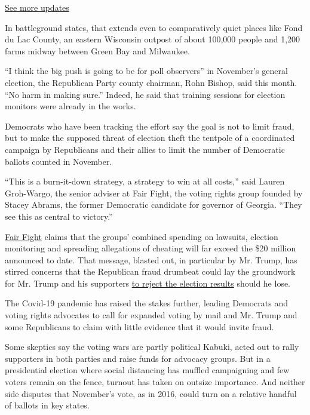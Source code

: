 \href{https://www.nytimes.com/2020/08/04/us/elections/primary-election-michigan-arizona-kansas.html?action=click\&pgtype=Article\&state=default\&region=MAIN_CONTENT_1\&context=storylines_live_updates}{See
more updates}

In battleground states, that extends even to comparatively quiet places
like Fond du Lac County, an eastern Wisconsin outpost of about 100,000
people and 1,200 farms midway between Green Bay and Milwaukee.

``I think the big push is going to be for poll observers'' in November's
general election, the Republican Party county chairman, Rohn Bishop,
said this month. ``No harm in making sure.'' Indeed, he said that
training sessions for election monitors were already in the works.

Democrats who have been tracking the effort say the goal is not to limit
fraud, but to make the supposed threat of election theft the tentpole of
a coordinated campaign by Republicans and their allies to limit the
number of Democratic ballots counted in November.

``This is a burn-it-down strategy, a strategy to win at all costs,''
said Lauren Groh-Wargo, the senior adviser at Fair Fight, the voting
rights group founded by Stacey Abrams, the former Democratic candidate
for governor of Georgia. ``They see this as central to victory.''

\href{https://fairfight.com/fair-fight-2020/}{Fair Fight} claims that
the groups' combined spending on lawsuits, election monitoring and
spreading allegations of cheating will far exceed the \$20 million
announced to date. That message, blasted out, in particular by Mr.
Trump, has stirred concerns that the Republican fraud drumbeat could lay
the groundwork for Mr. Trump and his supporters
\href{https://www.washingtonpost.com/opinions/2020/05/14/we-need-prepare-possibility-trump-rejecting-election-results/}{to
reject the election results} should he lose.

The Covid-19 pandemic has raised the stakes further, leading Democrats
and voting rights advocates to call for expanded voting by mail and Mr.
Trump and some Republicans to claim with little evidence that it would
invite fraud.

Some skeptics say the voting wars are partly political Kabuki, acted out
to rally supporters in both parties and raise funds for advocacy groups.
But in a presidential election where social distancing has muffled
campaigning and few voters remain on the fence, turnout has taken on
outsize importance. And neither side disputes that November's vote, as
in 2016, could turn on a relative handful of ballots in key states.

